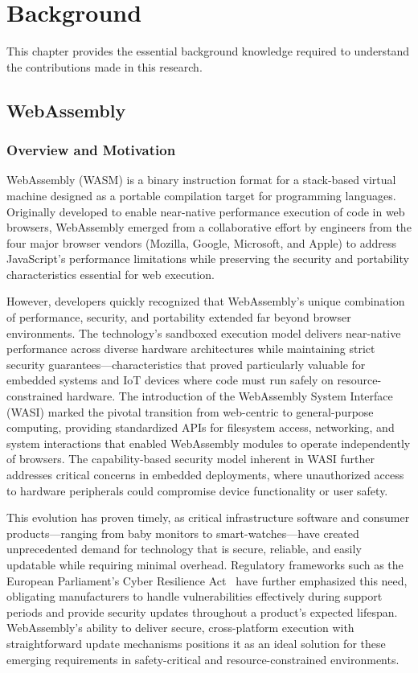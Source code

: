 \chapter{Background}
\label{chap:background}

This chapter provides the essential background knowledge required to understand the contributions made in this research.

\section{WebAssembly}
\label{sec:webassembly}

\subsection{Overview and Motivation}
\label{subsec:wasm-overview}

WebAssembly (WASM) is a binary instruction format for a stack-based virtual machine designed as a portable compilation target for programming languages\cite{rossberg2018webassembly}. Originally developed to enable near-native performance execution of code in web browsers, WebAssembly emerged from a collaborative effort by engineers from the four major browser vendors (Mozilla, Google, Microsoft, and Apple) to address JavaScript's performance limitations while preserving the security and portability characteristics essential for web execution.

However, developers quickly recognized that WebAssembly's unique combination of performance, security, and portability extended far beyond browser environments. The technology's sandboxed execution model delivers near-native performance across diverse hardware architectures while maintaining strict security guarantees—characteristics that proved particularly valuable for embedded systems and IoT devices where code must run safely on resource-constrained hardware. The introduction of the WebAssembly System Interface (WASI) marked the pivotal transition from web-centric to general-purpose computing, providing standardized APIs for filesystem access, networking, and system interactions that enabled WebAssembly modules to operate independently of browsers. The capability-based security model inherent in WASI further addresses critical concerns in embedded deployments, where unauthorized access to hardware peripherals could compromise device functionality or user safety.

This evolution has proven timely, as critical infrastructure software and consumer products—ranging from baby monitors to smart-watches—have created unprecedented demand for technology that is secure, reliable, and easily updatable while requiring minimal overhead. Regulatory frameworks such as the European Parliament's Cyber Resilience Act~\cite{eu_cyber_res_act} have further emphasized this need, obligating manufacturers to handle vulnerabilities effectively during support periods and provide security updates throughout a product's expected lifespan. WebAssembly's ability to deliver secure, cross-platform execution with straightforward update mechanisms positions it as an ideal solution for these emerging requirements in safety-critical and resource-constrained environments.

